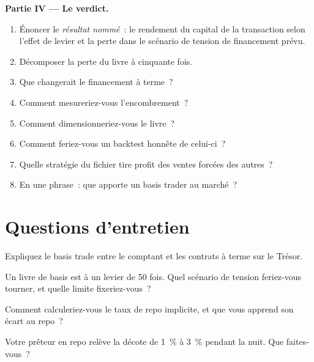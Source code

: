 \begin{problem}
\medskip\noindent\textbf{Partie IV --- Le verdict.}
\begin{enumerate}[resume]
\item Énoncer le \emph{résultat nommé}~: le rendement du capital de la transaction selon l'effet de levier et la perte dans le scénario de tension de financement prévu.
\item Décomposer la perte du livre à cinquante fois.
\item Que changerait le financement à terme~?
\item Comment mesureriez-vous l'encombrement~?
\item Comment dimensionneriez-vous le livre~?
\item Comment feriez-vous un backtest honnête de celui-ci~?
\item Quelle stratégie du fichier tire profit des ventes forcées des autres~?
\item En une phrase~: que apporte un basis trader au marché~?
\end{enumerate}
\end{problem}

\section{Questions d'entretien}

\begin{interviewq}\label{iq:s2:the-bond-futures-basis-trade:1}
Expliquez le basis trade entre le comptant et les contrats à terme sur le Trésor.
\end{interviewq}

\begin{interviewq}\label{iq:s2:the-bond-futures-basis-trade:2}
Un livre de basis est à un levier de 50 fois. Quel scénario de tension feriez-vous tourner, et quelle limite fixeriez-vous~?
\end{interviewq}

\begin{interviewq}\label{iq:s2:the-bond-futures-basis-trade:3}
Comment calculeriez-vous le taux de repo implicite, et que vous apprend son écart au repo~?
\end{interviewq}

\begin{interviewq}\label{iq:s2:the-bond-futures-basis-trade:4}
Votre prêteur en repo relève la décote de 1~\% à 3~\% pendant la nuit. Que faites-vous~?
\end{interviewq}

